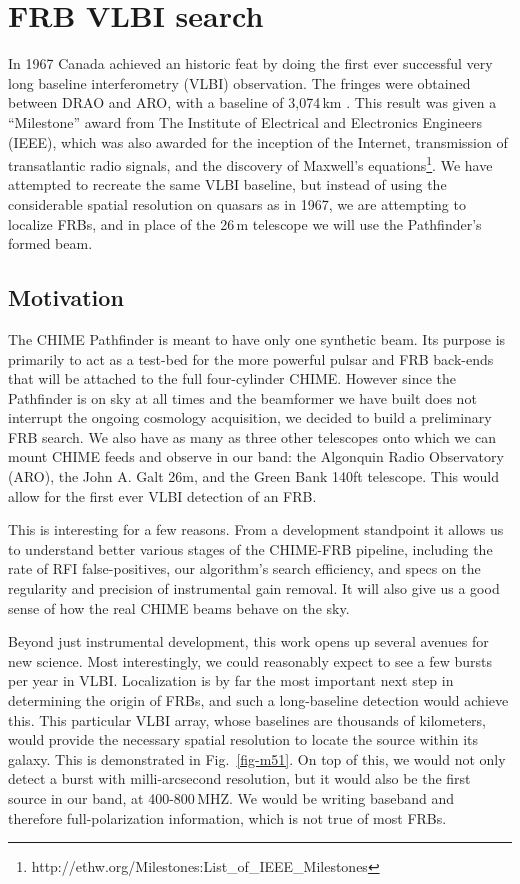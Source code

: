 \section{FRB VLBI search}
\label{vlbi_frb}

In 1967 Canada achieved an historic feat by doing 
the first ever successful very long 
baseline interferometry (VLBI) observation. The fringes were 
obtained between DRAO and ARO, with a baseline of 3,074\,km 
\citep{1967Natur.215...38B}. 
This result was given a ``Milestone'' award from 
The Institute of Electrical and Electronics Engineers (IEEE), 
which was also awarded for the inception of the Internet, transmission 
of transatlantic radio signals, and the discovery of Maxwell's 
equations\footnote{http://ethw.org/Milestones:List\_of\_IEEE\_Milestones}. 
We have attempted to recreate the same VLBI baseline, but instead of 
using the considerable spatial resolution on quasars as in 1967, 
we are attempting to localize FRBs, and in place of the 
26\,m telescope we will use the Pathfinder's formed beam.


\subsection{Motivation}

The CHIME Pathfinder is meant to have only one synthetic beam. 
Its purpose is primarily to act as a test-bed for the more powerful 
pulsar and FRB back-ends that will be attached to the 
full four-cylinder CHIME. However since the Pathfinder is on 
sky at all times and the beamformer we have built does not 
interrupt the ongoing cosmology acquisition, we decided to 
build a preliminary FRB search. We also have as many as three 
other telescopes onto which we can mount 
CHIME feeds and observe in our band: the Algonquin Radio Observatory (ARO), 
the John A. Galt 26m, and the Green Bank 140ft telescope. This would
allow for the first ever VLBI detection of an FRB. 

This is interesting for a few reasons. From a development 
standpoint it allows us to understand better various stages of the 
CHIME-FRB pipeline, including the rate of 
RFI false-positives, our algorithm's search 
efficiency, and specs on the regularity and precision of instrumental 
gain removal. It will also give us a good sense of how the real CHIME 
beams behave on the sky. 

Beyond just instrumental development, this work
opens up several avenues for new science. 
Most interestingly, 
we could reasonably expect to see a few bursts per year in 
VLBI. Localization is by far the most 
important next step in determining the origin of FRBs, and 
such a long-baseline detection would achieve this. This particular VLBI 
array, whose baselines are thousands of kilometers, would provide 
the necessary spatial resolution to locate the source 
within its galaxy. This is demonstrated in Fig.~\ref{fig-m51}.
On top of this, we would not only detect a burst with 
milli-arcsecond resolution, but it would also be the first source 
in our band, at 400-800\,MHZ. We 
would be writing baseband and therefore full-polarization information,
which is not true of most FRBs.

